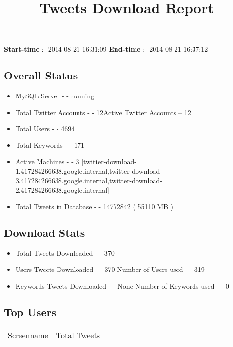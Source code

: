 \documentclass{article}\usepackage[T1]{fontenc}
\begin{document}
\title{\textbf{Tweets Download Report}}
               \date{}
                \maketitle
               \centerline{\textbf{Start-time} :- 2014-08-21 16:31:09 \hspace{40pt} \textbf{End-time} :- 2014-08-21 16:37:12}               \subsection*{Overall Status}                \begin{itemize}                \item MySQL Server - - running               \item Total Twitter Accounts - - 12\newline Active Twitter Accounts -- 12               \item Total Users - - 4694               \item Total Keywords - - 171               \item Active Machines - - 3 [twitter-download-1.417284266638.google.internal,twitter-download-3.417284266638.google.internal,twitter-download-2.417284266638.google.internal]               \item Total Tweets in Database - - 14772842 ( 55110 MB )               \end{itemize}               \subsection*{Download Stats}                \begin{itemize}                \item Total Tweets Downloaded - - 370               \item Users Tweets Downloaded - - 370 \newline Number of Users used - - 319               \item Keywords Tweets Downloaded - - None \newline Number of Keywords used - - 0              \end{itemize}              \subsection*{Top Users}\begin{tabular}{|c|c|}         \hline         Screenname & Total Tweets \\ 

\end{tabular}
\end{document}
